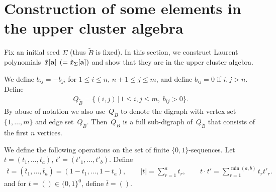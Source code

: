 \documentclass[pdftex]{sigma}
\numberwithin{equation}{section}
\begin{document}
\section{Construction of some elements in the upper cluster algebra}\label{section3}
Fix an initial seed $\Sigma$ (thus $\tilde{B}$ is f\/ixed). In this section, we construct Laurent polyno\-mials~$\tilde{x}[{\bf a}]$ $(=\tilde{x}_\Sigma[{\bf a}])$ and show that they are in the upper cluster algebra.

We def\/ine $b_{ij}=-b_{ji}$ for $1\le i\le n$, $n+1\le j\le m$, and def\/ine $b_{ij}=0$ if $i,j>n$.
Def\/ine
\begin{gather*}
Q_{\tilde B}=\{(i,j)\, |\, 1\le i,j\le m,\;  b_{ij}>0\}.
\end{gather*}
By abuse of notation we also use~$Q_{\tilde B}$ to denote the digraph with vertex set~$\{1,\dots,m\}$ and edge set~$Q_{\tilde B}$. Then~$Q_B$ is a full sub-digraph of~$Q_{\tilde B}$ that consists of the f\/irst $n$ vertices.

We def\/ine the following operations on the set of f\/inite $\{0,1\}$-sequences. Let $t=(t_1,\dots,t_a)$, $t'=(t'_1,\dots,t'_b)$. Def\/ine
\begin{gather}\label{eq:t sum and dot}
\bar{t}=(\bar{t}_1,\dots,\bar{t}_a)=(1-t_1,\dots,1-t_a),\qquad |t|=\sum_{r=1}^a t_r,\qquad t\cdot t'=\sum_{r=1}^{\min(a,b)} t_rt'_r.
\end{gather}
and for $t=()\in \{0,1\}^0$, def\/ine $\bar{t}=()$.
\end{document}
